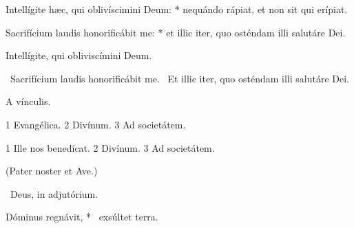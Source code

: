 Intellígite hæc, qui oblivíscimini Deum: * nequándo rápiat, et non sit qui erípiat.

Sacrifícium laudis honorificábit me: * et illic iter, quo osténdam illi salutáre Dei.

 Intellígite, qui obliviscímini Deum.

\V\ Sacrifícium laudis honorificábit me. \R\ Et illic iter, quo osténdam illi salutáre Dei.

 A vínculis.


 1 Evangélica. 2 Divínum. 3 Ad societátem.


 1 Ille nos benedícat. 2 Divínum. 3 Ad societátem.



(Pater noster et Ave.)

\V\ Deus, in adjutórium.

 Dóminus regnávit, * \textdagger\ exsúltet terra. \textdaggerdbl

